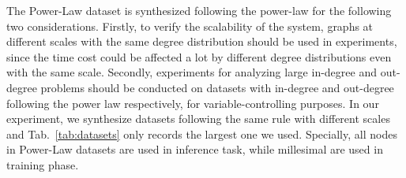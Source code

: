 \documentclass[conference]{IEEEtran}
\begin{document}
The Power-Law dataset is synthesized following the power-law\cite{b19} for the following two considerations.
Firstly, to verify the scalability of the system, graphs at different scales with the same degree distribution should be used in experiments, since the time cost could be affected a lot by different degree distributions even with the same scale.
Secondly, experiments for analyzing large in-degree and out-degree problems should be conducted on datasets with in-degree and out-degree following the power law respectively, for variable-controlling purposes. 
In our experiment, we synthesize datasets following the same rule with different scales and Tab.~\ref{tab:datasets} only records the largest one we used.
Specially, all nodes in Power-Law datasets are used in inference task, while millesimal are used in training phase.

\end{document}
